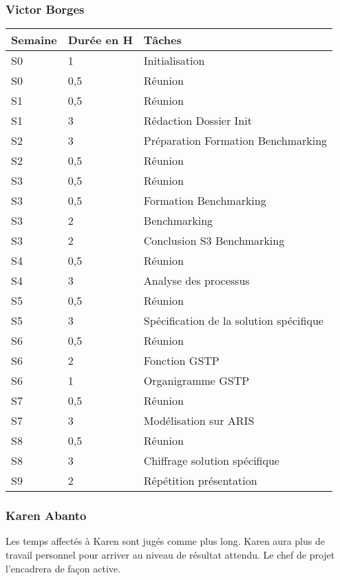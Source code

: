 \vfill
\pagebreak

\subsubsection{Victor Borges}


\begin{longtable}{|l|l|l|}
\hline
Semaine&Durée en H&Tâches\\
\hline
S0&1&Initialisation\\
\hline
S0&0,5&Réunion\\
\hline
S1&0,5&Réunion\\
\hline
S1&3&Rédaction Dossier Init\\
\hline
S2&3&Préparation Formation Benchmarking\\
\hline
S2&0,5&Réunion\\
\hline
S3&0,5&Réunion\\
\hline
S3&0,5&Formation Benchmarking\\
\hline
S3&2&Benchmarking\\
\hline
S3&2&Conclusion S3 Benchmarking\\
\hline
S4&0,5&Réunion\\
\hline
S4&3&Analyse des processus\\
\hline
S5&0,5&Réunion\\
\hline
S5&3&Spécification de la solution spécifique\\
\hline
S6&0,5&Réunion\\
\hline
S6&2&Fonction GSTP \\
\hline
S6&1&Organigramme GSTP\\
\hline
S7&0,5&Réunion\\
\hline
S7&3&Modélisation sur ARIS\\
\hline
S8&0,5&Réunion\\
\hline
S8&3&Chiffrage solution spécifique\\
\hline
S9&2&Répétition présentation\\
\hline
\end{longtable}
\vfill
\pagebreak

\subsubsection{Karen Abanto}

Les temps affectés à Karen sont jugés comme plus long. Karen aura plus de travail
personnel pour arriver au niveau de résultat attendu. 
Le chef de projet l'encadrera de façon active.

